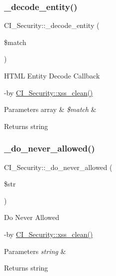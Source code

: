 \subsubsection{\texorpdfstring{\+\_\+decode\+\_\+entity()}{\_decode\_entity()}}
{\footnotesize\ttfamily C\+I\+\_\+\+Security\+::\+\_\+decode\+\_\+entity (\begin{DoxyParamCaption}\item[{}]{\$match }\end{DoxyParamCaption})\hspace{0.3cm}{\ttfamily [protected]}}

H\+T\+ML Entity Decode Callback

-\/by \mbox{\hyperlink{class_c_i___security_a2a5bb2a641bd37cbae73a96ee35dee30}{C\+I\+\_\+\+Security\+::xss\+\_\+clean()}} 
\begin{DoxyParams}[1]{Parameters}
array & {\em \$match} & \\
\hline
\end{DoxyParams}
\begin{DoxyReturn}{Returns}
string 
\end{DoxyReturn}
\mbox{\label{class_c_i___security_ad3471f31a4afa1d88b5a58705e951b88}} 
\subsubsection{\texorpdfstring{\+\_\+do\+\_\+never\+\_\+allowed()}{\_do\_never\_allowed()}}
{\footnotesize\ttfamily C\+I\+\_\+\+Security\+::\+\_\+do\+\_\+never\+\_\+allowed (\begin{DoxyParamCaption}\item[{}]{\$str }\end{DoxyParamCaption})\hspace{0.3cm}{\ttfamily [protected]}}

Do Never Allowed

-\/by \mbox{\hyperlink{class_c_i___security_a2a5bb2a641bd37cbae73a96ee35dee30}{C\+I\+\_\+\+Security\+::xss\+\_\+clean()}} 
\begin{DoxyParams}{Parameters}
{\em string} & \\
\hline
\end{DoxyParams}
\begin{DoxyReturn}{Returns}
string 
\end{DoxyReturn}
\mbox{\label{class_c_i___security_a5f41eab080092e9fcaabcb270cba98f3}} 
